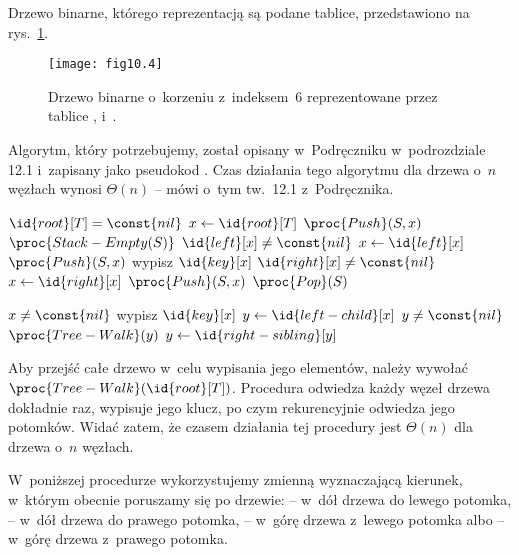 
\exercise %
Drzewo binarne, którego reprezentacją są podane tablice, przedstawiono na rys.~\ref{fig:10.4-1}.
\begin{figure}[ht]
	\begin{center}
		\texttt{[image: fig10.4]}
	\end{center}
	\caption{Drzewo binarne o~korzeniu z~indeksem~6 reprezentowane przez tablice ,  i~.} \label{fig:10.4-1}
\end{figure}

\exercise %
Algorytm, który potrzebujemy, został opisany w~Podręczniku w~podrozdziale 12.1 i~zapisany jako pseudokod . Czas działania tego algorytmu dla drzewa o~$n$ węzłach wynosi $\Theta(n)$ -- mówi o~tym tw.~12.1 z~Podręcznika.

\exercise %
\begin{codebox}
\li	\If $\id{root}[T]=\const{nil}$
\li		\Then \Return
		\End
\li	$x\gets\id{root}[T]$
\li	$\proc{Push}(S,x)$
\li	\While $\proc{Stack-Empty(S)}$
\li		\Do
			\If $\id{left}[x]\ne\const{nil}$
\li				\Then
					$x\gets\id{left}[x]$
\li					$\proc{Push}(S,x)$
\li				\Else
					wypisz $\id{key}[x]$
\li					\If $\id{right}[x]\ne\const{nil}$
\li						\Then
							$x\gets\id{right}[x]$
\li							$\proc{Push}(S,x)$
						\End
				\End
\li			$\proc{Pop}(S)$
		\End
\end{codebox}

\exercise %
\begin{codebox}
\li	\If $x\ne\const{nil}$
\li		\Then
			wypisz $\id{key}[x]$
\li			$y\gets\id{left-child}[x]$
\li			\While $y\ne\const{nil}$
\li				\Do
					$\proc{Tree-Walk}(y)$
\li					$y\gets\id{right-sibling}[y]$
				\End
		\End
\end{codebox}
Aby przejść całe drzewo w~celu wypisania jego elementów, należy wywołać $\proc{Tree-Walk}(\id{root}[T])$. Procedura odwiedza każdy węzeł drzewa dokładnie raz, wypisuje jego klucz, po czym rekurencyjnie odwiedza jego potomków. Widać zatem, że czasem działania tej procedury jest $\Theta(n)$ dla drzewa o~$n$ węzłach.

\exercise %
W~poniższej procedurze wykorzystujemy zmienną  wyznaczającą kierunek, w~którym obecnie poruszamy się po drzewie:  -- w~dół drzewa do lewego potomka,  -- w~dół drzewa do prawego potomka,  -- w~górę drzewa z~lewego potomka albo  -- w~górę drzewa z~prawego potomka.

